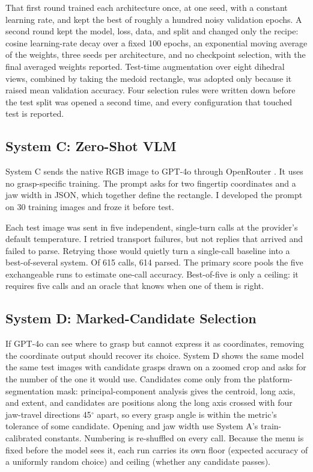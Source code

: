 \documentclass[10pt,conference,compsoc]{IEEEtran}
\begin{document}
That first round trained each architecture once, at one seed, with a
constant learning rate, and kept the best of roughly a hundred noisy
validation epochs. A second round kept the model, loss, data, and split and
changed only the recipe: cosine learning-rate decay over a fixed 100 epochs,
an exponential moving average of the weights, three seeds per architecture,
and no checkpoint selection, with the final averaged weights reported.
Test-time augmentation over eight dihedral views, combined by taking the
medoid rectangle, was adopted only because it raised mean validation
accuracy. Four selection rules were written down before the test split was
opened a second time, and every configuration that touched test is reported.

\subsection{System C: Zero-Shot VLM}

System C sends the native RGB image to GPT-4o through OpenRouter
\cite{openai2024}. It uses no grasp-specific training. The prompt asks for two
fingertip coordinates and a jaw width in JSON, which together define the
rectangle. I developed the prompt on 30 training images and froze it before
test.

Each test image was sent in five independent, single-turn calls at the
provider's default temperature. I retried transport failures, but not replies
that arrived and failed to parse. Retrying those would quietly turn a
single-call baseline into a best-of-several system. Of 615 calls, 614 parsed.
The primary score pools the five exchangeable runs to estimate one-call
accuracy. Best-of-five is only a ceiling: it requires five calls and an oracle
that knows when one of them is right.

\subsection{System D: Marked-Candidate Selection}

If GPT-4o can see where to grasp but cannot express it as coordinates,
removing the coordinate output should recover its choice. System D shows the
same model the same test images with candidate grasps drawn on a zoomed crop
and asks for the number of the one it would use. Candidates come only from
the platform-segmentation mask: principal-component analysis gives the
centroid, long axis, and extent, and candidates are positions along the long
axis crossed with four jaw-travel directions 45$^\circ$ apart, so every grasp
angle is within the metric's tolerance of some candidate. Opening and jaw
width use System A's train-calibrated constants. Numbering is re-shuffled on
every call. Because the menu is fixed before the model sees it, each run
carries its own floor (expected accuracy of a uniformly random choice) and
ceiling (whether any candidate passes).
\end{document}
